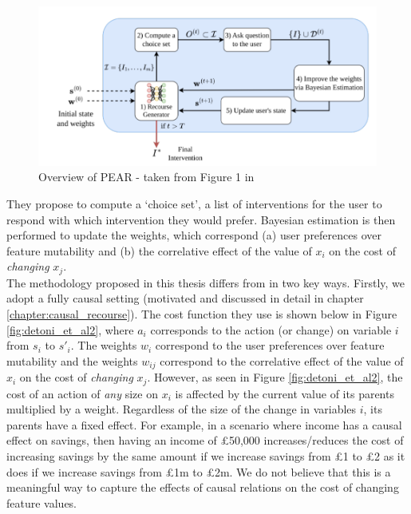 \begin{figure}[!htb]
	\centering
	\includegraphics[width=0.75\linewidth]{images/detoni_et_al.png}
	\caption{Overview of PEAR - taken from Figure 1 in \textcite{detoniPersonalizedAlgorithmicRecourse2023}}
	\label{fig:detoni_et_al}
\end{figure}
\bigskip
They propose to compute a `choice set', a list of interventions for the user to respond with which intervention they would prefer. Bayesian estimation is then performed to update the weights, which correspond (a) user preferences over feature mutability and (b) the correlative effect of the value of $x_i$ on the cost of \textit{changing} $x_j$.\\

The methodology proposed in this thesis differs from \textcite{detoniPersonalizedAlgorithmicRecourse2023} in two key ways. Firstly, we adopt a fully causal setting (motivated and discussed in detail in chapter \ref{chapter:causal_recourse}). The cost function they use is shown below in Figure \ref{fig:detoni_et_al2}, where $a_i$ corresponds to the action (or change) on variable $i$ from $s_i$ to $s'_i$. The weights $w_i$ correspond to the user preferences over feature mutability and the weights $w_{ij}$ correspond to the correlative effect of the value of $x_i$ on the cost of \textit{changing} $x_j$. However, as seen in Figure \ref{fig:detoni_et_al2}, the cost of an action of \textit{any} size on $x_i$ is affected by the current value of its parents multiplied by a weight. Regardless of the size of the change in variables $i$, its parents have a fixed effect. For example, in a scenario where income has a causal effect on savings, then having an income of £50,000 increases/reduces the cost of increasing savings by the same amount if we increase savings from £1 to £2 as it does if we increase savings from £1m to £2m. We do not believe that this is a meaningful way to capture the effects of causal relations on the cost of changing feature values.\\

